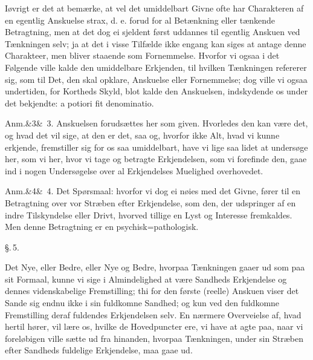 \documentclass[12pt]{book}
\def\sperr#1{#1}%
\def\textit#1{#1}%
\def\emph#1{#1}%
\newcommand{\sperr}[1]{\textls[180]{#1}}
\newcommand{\parag}[1]{%
  \par\vspace{0.9\baselineskip}%
  {\centering\textit{\S.\,#1.}\par}%
  \vspace{0.35\baselineskip}%
  \noindent\hspace{\parindent}\ignorespaces
}
\newcommand{\anm}[1]{%
  \par\vspace{0.5\baselineskip}%
  \noindent\hspace{\parindent}\sperr{Anm.}\ifx&#1&\else~\textit{#1}.\fi
  \enspace\ignorespaces
}
\newcommand{\opage}[1]{\marginnote{\footnotesize\textit{[#1]}}}
\begin{document}
Iøvrigt er det at bemærke, at vel det umiddelbart Givne ofte har Charakteren
af en egentlig Anskuelse strax, d. e. forud for al Betænkning eller tænkende
Betragtning, men at det dog ei sjeldent først uddannes til egentlig Anskuen
ved Tænkningen selv; ja at det i visse Tilfælde ikke engang kan siges at
antage denne Charakteer, men bliver staaende som \emph{Fornemmelse}. Hvorfor
vi ogsaa i det Følgende ville kalde den umiddelbare \emph{Erkjenden}, til
hvilken Tænkningen refererer sig, som til Det, den skal opklare,
\emph{Anskuelse} eller \emph{Fornemmelse}; dog ville vi ogsaa undertiden, for
Kortheds Skyld, blot kalde den Anskuelsen, indskydende os under det bekjendte:
\textit{a potiori fit denominatio}.

\anm{3} Anskuelsen forudsættes her som given. Hvorledes den kan være det, og
hvad det vil sige, at den er det, saa og, hvorfor ikke Alt, hvad vi kunne
erkjende, fremstiller sig for os saa umiddelbart, have vi lige saa lidet at
undersøge her, som vi her, hvor vi tage og betragte Erkjendelsen, som vi
forefinde den, gaae ind i
\opage{13} nogen Undersøgelse over al Erkjendelses Muelighed overhovedet.

\anm{4} Det Spørsmaal: \emph{hvorfor vi dog ei nøies med det Givne}, fører til
en Betragtning over vor Stræben efter Erkjendelse, som den, der udspringer af
en indre Tilskyndelse eller Drivt, hvorved tillige en Lyst og Interesse
fremkaldes. Men denne Betragtning er en psychisk=pathologisk.
\parag{5}
Det Nye, eller Bedre, eller Nye og Bedre, hvorpaa Tænkningen gaaer ud som paa
sit \emph{Formaal}, kunne vi sige i Almindelighed at være Sandheds
\emph{Erkjendelse} og dennes videnskabelige Fremstilling; thi for den første
(reelle) Anskuen viser det Sande sig endnu ikke i sin fuldkomne Sandhed; og
kun ved den fuldkomne Fremstilling deraf fuldendes Erkjendelsen selv. En
nærmere Overveielse af, hvad hertil hører, vil lære os, hvilke de
\emph{Hovedpuncter} ere, vi have at agte paa, naar vi foreløbigen ville sætte
ud fra hinanden, hvorpaa Tænkningen, under sin Stræben efter Sandheds
fuldelige Erkjendelse, maa gaae ud.
\end{document}
